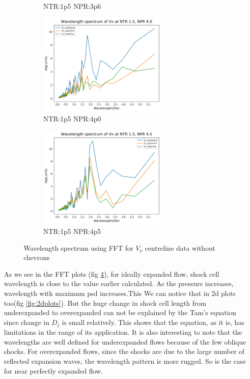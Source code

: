 \begin{figure}[H]
\begin{subfigure}{0.5\textwidth}
	\caption{NTR:1p5 NPR:3p6 }
	\label{fig:fftplots1p53p6}
\end{subfigure}
\begin{subfigure}{0.5\textwidth}
	\centering
	\includegraphics[width=2.5in]{images/Fft_Vx_NTR1p5_NPR4p0.png}
	\caption{NTR:1p5 NPR:4p0 }
	\label{fig:fftplots1p54p0}
\end{subfigure}
\begin{subfigure}{1.0\textwidth}
	\centering
	\includegraphics[width=2.5in]{images/Fft_Vx_NTR1p5_NPR4p5.png}
	\caption{NTR:1p5 NPR:4p5 }
	\label{fig:fftplots1p54p5}
\end{subfigure}
\caption{Wavelength spectrum using FFT for $V_x$ centreline data without chevrons}
\label{fig:fftplots}
\end{figure}

As we see in the FFT plots (fig \ref{fig:fftplots}), for ideally expanded flow, shock cell wavelength is close to the value earlier calculated. As the pressure increases, wavelength with maximum psd increases.This We can notice that in 2d plots too(fig \ref{fig:2dplots}). But the huge change in shock cell length from underexpanded to overexpanded can not be explained by the Tam's equation since change in $D_j$ is small relatively. This shows that the equation, as it is, has limitations in the range of its application.  It is also interesting to note that the wavelengths are well defined for underexpanded flows because of the few oblique shocks. For overexpanded flows, since the shocks are due to the large number of reflected expansion waves, the wavelength pattern is more rugged. So is the case for near perfectly expanded flow.\\

